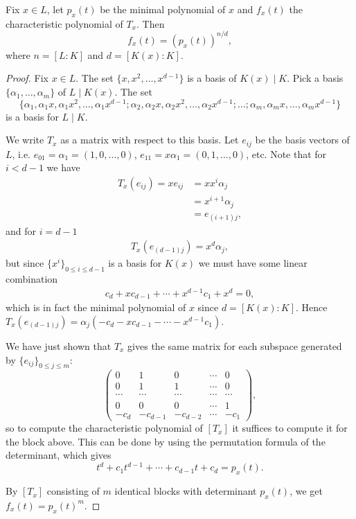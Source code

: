 \begin{prop}
	Fix $x\in L$, let $p_x(t)$ be the minimal polynomial of $x$ and $f_x(t)$ the characteristic polynomial of $T_x$. Then
	\[
		f_x(t) = (p_x(t))^{n/d},
	\]
	where $n=[L:K]$ and $d=[K(x):K]$.
\end{prop}
\begin{proof}
	Fix $x\in L$. The set $\{x,x^2,\dots,x^{d-1}\}$ is a basis of $K(x)\mid K$. Pick a basis $\{\alpha_1,\dots,\alpha_m\}$ of $L\mid K(x)$. The set 
	\[
		\{\alpha_1, \alpha_1 x,\alpha_1 x^2, \dots, \alpha_1 x^{d-1}; \alpha_2, \alpha_2 x, \alpha_2 x^2, \dots, \alpha_2 x^{d-1}; \dots ; \alpha_m, \alpha_m x, \dots, \alpha_m x^{d-1}\}
	\]
	is a basis for $L\mid K$.

	We write $T_x$ as a matrix with respect to this basis. Let $e_{ij}$ be the basis vectors of $L$, i.e. $e_{01} = \alpha_1 = (1,0,\dots,0)$, $e_{11} = x \alpha_1 = (0,1,\dots,0)$, etc. Note that for $i<d-1$ we have
	\begin{align*}
		T_x(e_{ij}) = x e_{ij} &= x x^i \alpha_j\\
			&= x^{i+1} \alpha_j\\
			&= e_{(i+1)j},
	\end{align*}
	and for $i=d-1$
	\begin{align*}
		T_x(e_{(d-1)j}) = x^d \alpha_j,
	\end{align*}
	but since $\{x^i\}_{0\leq i \leq d-1}$ is a basis for $K(x)$ we must have some linear combination 
	\begin{align*}
		c_d + x c_{d-1} + \cdots + x^{d-1} c_1 + x^d = 0,
	\end{align*}
	which is in fact the minimal polynomial of $x$ since $d=[K(x):K]$. Hence $T_x(e_{(d-1)j}) = \alpha_j (-c_d - x c_{d-1} - \cdots - x^{d-1} c_1)$.
	
	We have just shown that $T_x$ gives the same matrix for each subspace generated by $\{e_{ij}\}_{0\leq j\leq m}$:
	\[
	\begin{pmatrix}
		0 & 1 & 0 & \cdots & 0\\
		0 & 1 & 1 & \cdots & 0\\
		\cdots & \cdots & \cdots & \cdots & \cdots\\
		0 & 0 & 0 & \cdots & 1\\
		-c_d & -c_{d-1} & -c_{d-2} & \cdots & -c_1
	\end{pmatrix},
	\]
	so to compute the characteristic polynomial of $[T_x]$ it suffices to compute it for the block above. This can be done by using the permutation formula of the determinant, which gives
	\[
		t^d + c_1 t^{d-1} + \cdots + c_{d-1} t + c_d = p_x(t).
	\]

	By $[T_x]$ consisting of $m$ identical blocks with determinant $p_x(t)$, we get $f_x(t)=p_x(t)^m$.

\end{proof}

